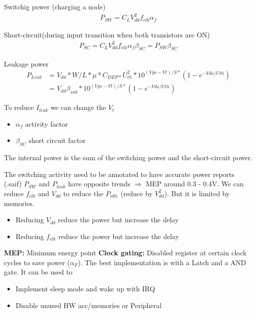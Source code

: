 Switchig power (charging a node)
\begin{align}
 P_{SW} = C_L V^2_{dd} f_{clk} \alpha_f
\end{align}

Short-circuit(during input transition when both transistors are ON)
\begin{align}
  P_{SC} = C_L V^2_{dd} f_{clk} \alpha_f \beta_{SC} = P_{SW} \beta_{SC} 
\end{align}

Leakage power
\begin{align}
  P_{Leak} &= V_{dd} * W/L *\mu * C_{DEP*} U_{th}^2* 10^{(Vgs-Vt)/S *} (1 -e ^{-Vds/Uth})\\
           &= V_{dd} \beta_{sub} * 10^{(Vgs-Vt)/S *} (1 -e ^{-Vds/Uth})
\end{align}

To reduce \(I_{leak}\) we can change the \(V_t\) %
\bigbreak

\begin{itemize}
  \item \(\alpha_f\) activity factor
  \item \(\beta_{SC}\) short circuit factor
\end{itemize}

\bigbreak

The internal power is the sum of the switching power and the short-circuit power.

The switching activity need to be annotated to have accurate power reports (.saif)
\bigbreak
\(P_{SW}\) and \(P_{leak}\) have opposite trends \(\Rightarrow\) MEP around 0.3 - 0.4V. We can reduce \(f_{clk}\) and \(V_{dd}\)  to reduce the \(P_{idle}\) (reduce by \(V_{dd}^2\)). But it is limited by memories.
\begin{itemize}
  \item Reducing \(V_{dd}\) reduce the power but increase the delay
  \item Reducing \(f_{clk}\) reduce the power but increase the delay
\end{itemize}

\textbf{MEP:} Minimum energy point
\bigbreak
\textbf{Clock gating:} Disabled register at certain clock cycles to save power (\(\alpha_F\)). The best implementation is with a Latch and a AND gate. It can be used to
\begin{itemize}
  \item Implement sleep mode and wake up with IRQ
  \item Disable unused HW acc/memories or Peripheral
\end{itemize}

